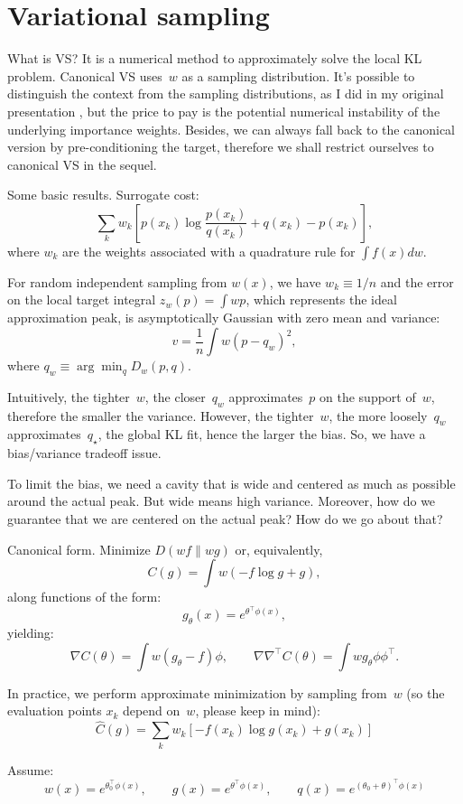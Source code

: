 \documentclass{article}
\begin{document}
\section{Variational sampling}

What is VS? It is a numerical method to approximately solve the local KL problem. Canonical VS uses~$w$ as a sampling distribution. It's possible to distinguish the context from the sampling distributions, as I did in my original presentation \cite{ijasp:13}, but the price to pay is the potential numerical instability of the underlying importance weights. Besides, we can always fall back to the canonical version by pre-conditioning the target, therefore we shall restrict ourselves to canonical VS in the sequel.

Some basic results. Surrogate cost:
$$
\sum_k 
w_k \left[
p(x_k) \log \frac{p(x_k)}{q(x_k)} + q(x_k) - p(x_k)
\right],
$$
where $w_k$ are the weights associated with a quadrature rule for $\int f(x)dw$. 

For random independent sampling from $w(x)$, we have $w_k\equiv 1/n$ and the error on the local target integral $z_w(p)= \int wp$, which represents the ideal approximation peak, is asymptotically Gaussian with zero mean and variance:
$$
v = \frac{1}{n} \int w(p-q_w)^2 ,
$$
where $q_w\equiv\arg\min_q D_w(p,q)$.

Intuitively, the tighter~$w$, the closer~$q_w$ approximates~$p$ on the support of~$w$, therefore the smaller the variance. However, the tighter~$w$, the more loosely~$q_w$ approximates~$q_\star$, the global KL fit, hence the larger the bias. So, we have a bias/variance tradeoff issue.

To limit the bias, we need a cavity that is wide and centered as much as possible around the actual peak. But wide means high variance. Moreover, how do we guarantee that we are centered on the actual peak? How do we go about that?

Canonical form. Minimize $D(wf\|wg)$ or, equivalently,
$$
C(g) = \int w(-f \log g + g),
$$
along functions of the form:
$$
g_\theta(x) = e^{\theta^\top \phi(x)},
$$
yielding:
$$
\nabla C (\theta) = \int w (g_\theta-f) \phi,
\qquad
\nabla \nabla^\top C(\theta) = \int w g_\theta \phi\phi^\top.
$$

In practice, we perform approximate minimization by sampling from~$w$ (so the evaluation points $x_k$ depend on~$w$, please keep in mind):
$$
\hat{C}(g) = \sum_k w_k \left[
-f(x_k) \log g(x_k) + g(x_k)
\right]
$$

Assume:
$$
w(x) = e^{\theta_0^\top \phi(x)},
\qquad
g(x) = e^{\theta^\top \phi(x)},
\qquad
q(x) = e^{(\theta_0+\theta)^\top \phi(x)}
$$
\end{document}
